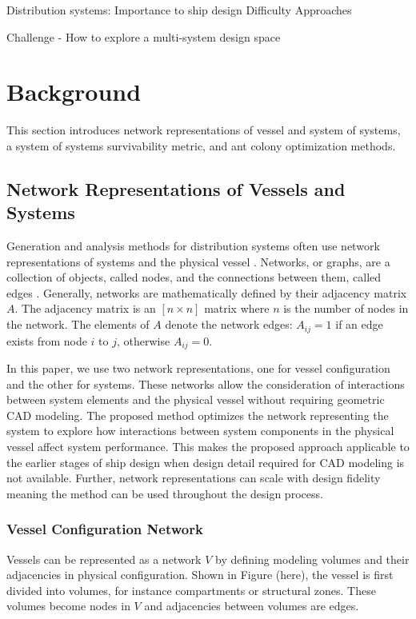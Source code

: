 \documentclass[preprint,12pt]{elsarticle}
\begin{document}
Distribution systems:
Importance to ship design
Difficulty
Approaches

Challenge - How to explore a multi-system design space

\section{Background}
This section introduces network representations of vessel and system of systems, a system of systems survivability metric, and ant colony optimization methods.

\subsection{Network Representations of Vessels and Systems} 
Generation and analysis methods for distribution systems often use network representations of systems and the physical vessel \cite{Gillespie2013,Rigterink2014,Dellsy2015,Trapp2015}. Networks, or graphs, are a collection of objects, called nodes, and the connections between them, called edges \cite{Newman2003}. Generally, networks are mathematically defined by their adjacency matrix $A$. The adjacency matrix is an $[n\times n]$ matrix where $n$ is the number of nodes in the network. The elements of $A$ denote the network edges: $A_{ij}=1$ if an edge exists from node $i$ to $j$, otherwise $A_{ij}=0$.

In this paper, we use two network representations, one for vessel configuration and the other for systems. These networks allow the consideration of interactions between system elements and the physical vessel without requiring geometric CAD modeling. The proposed method optimizes the network representing the system to explore how interactions between system components in the physical vessel affect system performance. This makes the proposed approach applicable to the earlier stages of ship design when design detail required for CAD modeling is not available. Further, network representations can scale with design fidelity \cite{Rigterink2014, Gillespie2012} meaning the method can be used throughout the design process.

\subsubsection{Vessel Configuration Network} \label{sec:vesselmodel}
Vessels can be represented as a network $V$ by defining modeling volumes and their adjacencies in physical configuration. Shown in Figure (here), the vessel is first divided into volumes, for instance compartments or structural zones. These volumes become nodes in $V$ and adjacencies between volumes are edges. 
\end{document}
